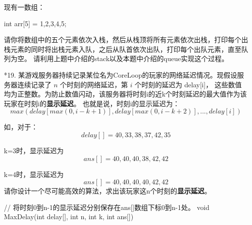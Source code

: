 \begin{exercise}
    现有一数组：
    \begin{cppcode}
        int arr[5] = {1,2,3,4,5};
    \end{cppcode}
    请你将数组中的五个元素依次入栈，然后从栈顶将所有元素依次出栈，打印每个出栈元素的同时将出栈元素入队，之后从队首依次出队，打印每个出队元素，直至队列为空。
    请利用上题中介绍的stack以及本题中介绍的queue实现这个过程。

    \vspace{\baselineskip}
    

    *19. 某游戏服务器持续记录某位名为CoreLoop的玩家的网络延迟情况。现假设服务器连续记录了 \(n\) 个时刻的网络延迟，第 \(i\) 个时刻的延迟为 delay[i]，
    这些数值均为正整数。为防止数值闪动，该服务器将时刻i的近k个时刻延迟的最大值作为该玩家在时刻i的\textbf{显示延迟}。
    也就是说，时刻i的显示延迟为：
    \[
        max(delay[max(0, i-k+1)], delay[max(0, i-k+2)], ..., delay[i])
    \]

    如，对于：
    \[
        delay[] = {40, 33, 38, 37, 42, 35}
    \]

    k=3时，显示延迟为
    \[
        ans[]   = {40, 40, 40, 38, 42, 42}
    \]

    k=4时，显示延迟为
    \[
        ans[]   = {40, 40, 40, 40, 42, 42}
    \]
    请你设计一个尽可能高效的算法，求出该玩家这n个时刻的\textbf{显示延迟}。
    \begin{cppcode}
    // 将时刻0到n-1的显示延迟分别保存在ans[]数组下标0到n-1处。
        void MaxDelay(int delay[], int n, int k, int ans[]) {

        }
    \end{cppcode}



\end{exercise}
\clearpage

